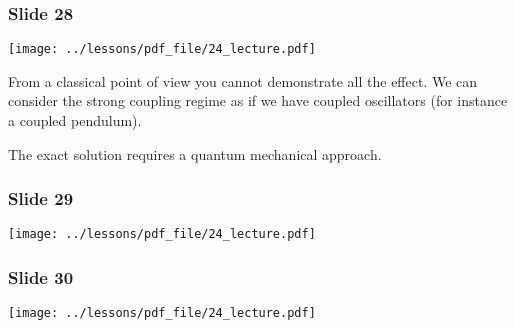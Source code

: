 \documentclass[../main/main.tex]{subfiles}
\begin{document}
\subsubsection*{Slide 28}

\begin{minipage}[]{0.5\linewidth}
\centering
\texttt{[image: ../lessons/pdf\_file/24\_lecture.pdf]}
\end{minipage}
\hspace{0.3cm}\vspace{0.3cm}
\begin{minipage}[c]{0.47\linewidth}

From a classical point of view you cannot demonstrate all the effect. We can consider the strong coupling regime as if we have coupled oscillators (for instance a coupled pendulum).

The exact solution requires a quantum mechanical approach.

\end{minipage}

\subsubsection*{Slide 29}

\begin{minipage}[]{0.5\linewidth}
\centering
\texttt{[image: ../lessons/pdf\_file/24\_lecture.pdf]}
\end{minipage}
\hspace{0.3cm}\vspace{0.3cm}
\begin{minipage}[c]{0.47\linewidth}

\end{minipage}

\subsubsection*{Slide 30}

\begin{minipage}[]{0.5\linewidth}
\centering
\texttt{[image: ../lessons/pdf\_file/24\_lecture.pdf]}
\end{minipage}
\hspace{0.3cm}\vspace{0.3cm}
\begin{minipage}[c]{0.47\linewidth}

\end{minipage}
\end{document}

